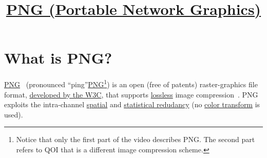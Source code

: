 \title{\href{http://www.libpng.org/pub/png}{PNG (Portable
  Network Graphics)}}

\maketitle
\tableofcontents

\section{What is PNG?}

\href{https://en.wikipedia.org/wiki/Portable_Network_Graphics}{PNG}~\cite{roelofs1999png,world2003portable}
(pronounced
``ping''\href{https://www.youtube.com/watch?v=EFUYNoFRHQI}{PNG}\footnote{Notice
  that only the first part of the video describes PNG. The second part
  refers to QOI that is a different image compression scheme.}) is an
open (free of patents) raster-graphics file format,
\href{https://en.wikipedia.org/wiki/Portable_Network_Graphics}{developed
  by the W3C}, that supports
\href{https://en.wikipedia.org/wiki/Lossless_compression}{lossless}
image compression~\cite{roelofs1999png}. PNG exploits the
intra-channel
\href{https://en.wikipedia.org/wiki/Image_compression}{spatial} and
\href{https://en.wikipedia.org/wiki/Data_compression}{statistical
  redudancy} (no \href{https://en.wikipedia.org/wiki/YUV}{color
  transform} is used).

